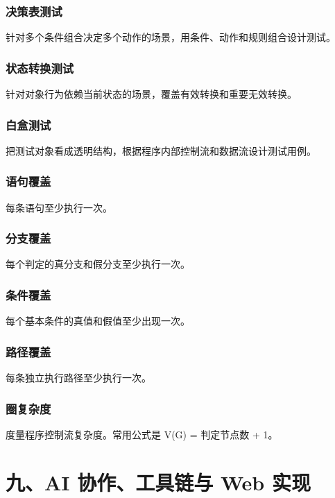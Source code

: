 \documentclass[UTF8,zihao=-4]{ctexart}
\begin{document}
\subsubsection*{决策表测试}


针对多个条件组合决定多个动作的场景，用条件、动作和规则组合设计测试。


\subsubsection*{状态转换测试}


针对对象行为依赖当前状态的场景，覆盖有效转换和重要无效转换。


\subsubsection*{白盒测试}


把测试对象看成透明结构，根据程序内部控制流和数据流设计测试用例。


\subsubsection*{语句覆盖}


每条语句至少执行一次。


\subsubsection*{分支覆盖}


每个判定的真分支和假分支至少执行一次。


\subsubsection*{条件覆盖}


每个基本条件的真值和假值至少出现一次。


\subsubsection*{路径覆盖}


每条独立执行路径至少执行一次。


\subsubsection*{圈复杂度}


度量程序控制流复杂度。常用公式是 V(G) = 判定节点数 + 1。


\section{九、AI 协作、工具链与 Web 实现}
\end{document}
